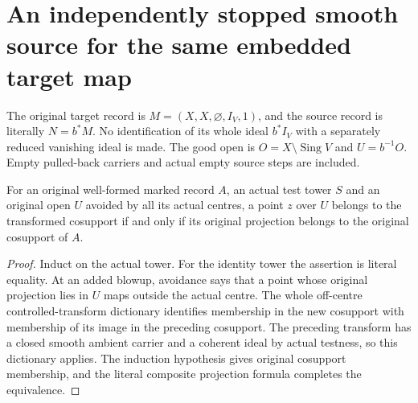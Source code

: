 \section{An independently stopped smooth source for the same embedded target map}

The original target record is $M=(X,X,\varnothing,I_V,1)$, and the source
record is literally $N=b^*M$.  No identification of its whole ideal
$b^*I_V$ with a separately reduced vanishing ideal is made.  The good open
is $O=X\setminus\operatorname{Sing}V$ and $U=b^{-1}O$.  Empty pulled-back
carriers and actual empty source steps are included.

\begin{lemma}
\label{hir:original-cosupport-persistence-avoided-open}
\leanok
For an original well-formed marked record $A$, an actual test tower $S$
and an original open $U$ avoided by all its actual centres, a point $z$
over $U$ belongs to the transformed cosupport if and only if its original
projection belongs to the original cosupport of $A$.
\end{lemma}
\begin{proof}
Induct on the actual tower.  For the identity tower the assertion is
literal equality.  At an added blowup, avoidance says that a point whose
original projection lies in $U$ maps outside the actual centre.  The
whole off-centre controlled-transform dictionary identifies membership
in the new cosupport with membership of its image in the preceding
cosupport.  The preceding transform has a closed smooth ambient carrier
and a coherent ideal by actual testness, so this dictionary applies.
The induction hypothesis gives original cosupport membership, and the
literal composite projection formula completes the equivalence.
\end{proof}

